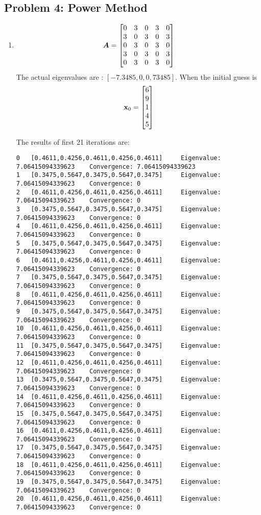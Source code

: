 \documentclass{article}
\begin{document}
\hypertarget{problem_0_homework_checklist_2}{}
\subsection*{{Problem 4: Power Method}}
\label{}
\begin{enumerate} 
\item 
\begin{align}
\boldsymbol{A}=\begin{bmatrix} 
0 & 3 & 0 & 3 & 0   \\  
3 & 0 & 3 & 0 & 3   \\  
0 & 3 & 0 & 3 & 0   \\  
3 & 0 & 3 & 0 & 3   \\  
0 & 3 & 0 & 3 & 0  \\   \end{bmatrix}
\end{align}
The actual eigenvalues are : $[-7.3485, 0, 0, 73485] $.  
When the initial guess is 
\begin{align}
\boldsymbol{\mathrm{x}}_0=\begin{bmatrix} 6 \\ 9 \\ 1\\ 4 \\5 \end{bmatrix}
\end{align}

The results of first 21 iterations are: 
\begin{verbatim}
0	[0.4611,0.4256,0.4611,0.4256,0.4611]	 Eigenvalue: 7.06415094339623	 Convergence: 7.06415094339623
1	[0.3475,0.5647,0.3475,0.5647,0.3475]	 Eigenvalue: 7.06415094339623	 Convergence: 0
2	[0.4611,0.4256,0.4611,0.4256,0.4611]	 Eigenvalue: 7.06415094339623	 Convergence: 0
3	[0.3475,0.5647,0.3475,0.5647,0.3475]	 Eigenvalue: 7.06415094339623	 Convergence: 0
4	[0.4611,0.4256,0.4611,0.4256,0.4611]	 Eigenvalue: 7.06415094339623	 Convergence: 0
5	[0.3475,0.5647,0.3475,0.5647,0.3475]	 Eigenvalue: 7.06415094339623	 Convergence: 0
6	[0.4611,0.4256,0.4611,0.4256,0.4611]	 Eigenvalue: 7.06415094339623	 Convergence: 0
7	[0.3475,0.5647,0.3475,0.5647,0.3475]	 Eigenvalue: 7.06415094339623	 Convergence: 0
8	[0.4611,0.4256,0.4611,0.4256,0.4611]	 Eigenvalue: 7.06415094339623	 Convergence: 0
9	[0.3475,0.5647,0.3475,0.5647,0.3475]	 Eigenvalue: 7.06415094339623	 Convergence: 0
10	[0.4611,0.4256,0.4611,0.4256,0.4611]	 Eigenvalue: 7.06415094339623	 Convergence: 0
11	[0.3475,0.5647,0.3475,0.5647,0.3475]	 Eigenvalue: 7.06415094339623	 Convergence: 0
12	[0.4611,0.4256,0.4611,0.4256,0.4611]	 Eigenvalue: 7.06415094339623	 Convergence: 0
13	[0.3475,0.5647,0.3475,0.5647,0.3475]	 Eigenvalue: 7.06415094339623	 Convergence: 0
14	[0.4611,0.4256,0.4611,0.4256,0.4611]	 Eigenvalue: 7.06415094339623	 Convergence: 0
15	[0.3475,0.5647,0.3475,0.5647,0.3475]	 Eigenvalue: 7.06415094339623	 Convergence: 0
16	[0.4611,0.4256,0.4611,0.4256,0.4611]	 Eigenvalue: 7.06415094339623	 Convergence: 0
17	[0.3475,0.5647,0.3475,0.5647,0.3475]	 Eigenvalue: 7.06415094339623	 Convergence: 0
18	[0.4611,0.4256,0.4611,0.4256,0.4611]	 Eigenvalue: 7.06415094339623	 Convergence: 0
19	[0.3475,0.5647,0.3475,0.5647,0.3475]	 Eigenvalue: 7.06415094339623	 Convergence: 0
20	[0.4611,0.4256,0.4611,0.4256,0.4611]	 Eigenvalue: 7.06415094339623	 Convergence: 0
\end{verbatim}




\end{enumerate}
\end{document}

